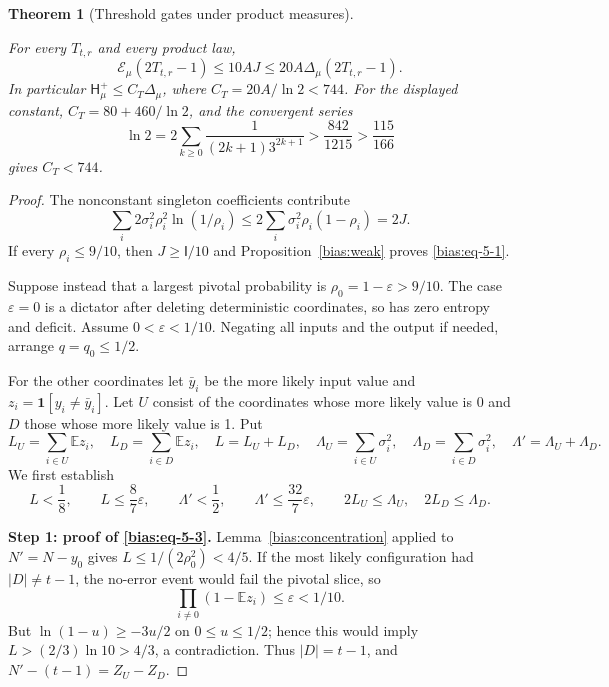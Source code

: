 \documentclass[11pt]{amsart}
\newtheorem{theorem}{Theorem}[section]
\theoremstyle{definition}
\theoremstyle{remark}
\newcommand{\HH}{\mathsf H}
\newcommand{\I}{\mathsf I}
\begin{document}
\begin{theorem}[Threshold gates under product measures]\label{bias:strong}

For every \(T_{t,r}\) and every product law, \begin{equation}\label{bias:eq-5-1}
\mathcal E_\mu(2T_{t,r}-1)\le10A J\le20A \Delta_\mu(2T_{t,r}-1).
\end{equation} In particular \(\HH_\mu^+\le C_T \Delta_\mu\), where \(C_T=20A/\ln2<744\). For the displayed constant, \(C_T=80+460/\ln2\), and the convergent series \[
 \ln2=2\sum_{k\ge0}\frac1{(2k+1)3^{2k+1}}
   >\frac{842}{1215}>\frac{115}{166}
\] gives \(C_T<744\).

\end{theorem}
\begin{proof}

The nonconstant singleton coefficients contribute \begin{equation}\label{bias:eq-5-2}
\sum_i2\sigma_i^2\rho_i^2\ln(1/\rho_i)
 \le2\sum_i\sigma_i^2\rho_i(1-\rho_i)=2J.
\end{equation} If every \(\rho_i\le9/10\), then \(J\ge \I/10\) and Proposition~\ref{bias:weak} proves \eqref{bias:eq-5-1}.

Suppose instead that a largest pivotal probability is \(\rho_0=1-\varepsilon>9/10\). The case \(\varepsilon=0\) is a dictator after deleting deterministic coordinates, so has zero entropy and deficit. Assume \(0<\varepsilon<1/10\). Negating all inputs and the output if needed, arrange \(q=q_0\le1/2\).

For the other coordinates let \(\bar y_i\) be the more likely input value and \(z_i=\mathbf1[y_i\ne\bar y_i]\). Let \(U\) consist of the coordinates whose more likely value is 0 and \(D\) those whose more likely value is 1. Put \[
 L_U=\sum_{i\in U}\mathbb Ez_i,\quad
 L_D=\sum_{i\in D}\mathbb Ez_i,\quad L=L_U+L_D,
 \quad
 \Lambda_U=\sum_{i\in U}\sigma_i^2,\quad
 \Lambda_D=\sum_{i\in D}\sigma_i^2,\quad
 \Lambda'=\Lambda_U+\Lambda_D.
\] We first establish \begin{equation}\label{bias:eq-5-3}
L<\frac18,\qquad L\le\frac87\varepsilon,\qquad
 \Lambda'<\frac12,\qquad
 \Lambda'\le\frac{32}{7}\varepsilon,\qquad
 2L_U\le\Lambda_U,\quad2L_D\le\Lambda_D.
\end{equation}

\textbf{Step 1: proof of \eqref{bias:eq-5-3}.} Lemma~\ref{bias:concentration} applied to \(N'=N-y_0\) gives \(L\le1/(2\rho_0^2)<4/5\). If the most likely configuration had \(|D|\ne t-1\), the no-error event would fail the pivotal slice, so \[
 \prod_{i\ne0}(1-\mathbb Ez_i)\le\varepsilon<1/10.
\] But \(\ln(1-u)\ge-3u/2\) on \(0\le u\le1/2\); hence this would imply \(L>(2/3)\ln10>4/3\), a contradiction. Thus \(|D|=t-1\), and \(N'-(t-1)=Z_U-Z_D\).


\end{proof}
\end{document}
